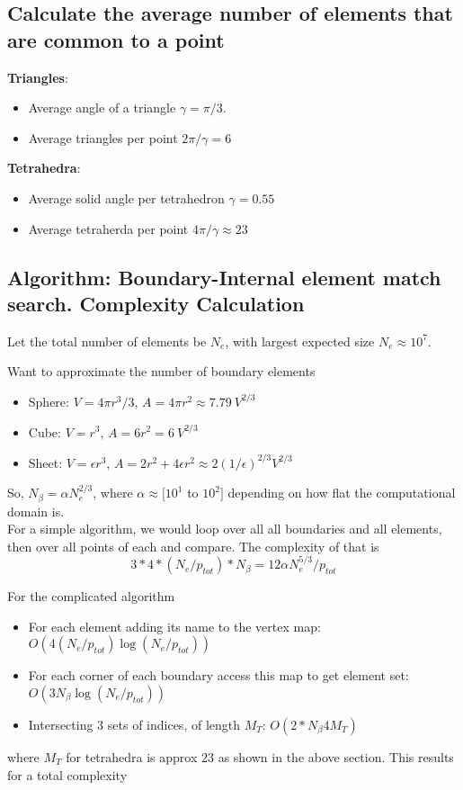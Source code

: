 \documentclass[12pt]{article}
\begin{document}
\newpage
\appendix

\subsection{Calculate the average number of elements that are common to a point}

\textbf{Triangles}:
\begin{itemize}
	\item Average angle of a triangle $\gamma = \pi/3$.
	\item Average triangles per point $2\pi / \gamma = 6$
\end{itemize}
\noindent
\textbf{Tetrahedra}:
\begin{itemize}
	\item Average solid angle per tetrahedron $\gamma = 0.55$
	\item Average tetraherda per point $4\pi / \gamma \approx 23$
\end{itemize}

\subsection{Algorithm: Boundary-Internal element match search. Complexity Calculation}

\noindent
Let the total number of elements be $N_e$, with largest expected size $N_e \approx 10^7$.

\noindent
Want to approximate the number of boundary elements
\begin{itemize}
	\item Sphere: $V = 4\pi r^3 / 3$, $A = 4\pi r^2 \approx 7.79\ V^{2/3}$
	\item Cube: $V = r^3$, $A = 6 r^2 = 6\ V^{2/3}$
	\item Sheet: $V = \epsilon r^3$, $A = 2 r^2 + 4\epsilon r^2 \approx 2(1/\epsilon)^{2/3} V^{2/3}$
\end{itemize}
\noindent
So, $N_{\beta} = \alpha N_e^{2/3}$, where $\alpha \approx [10^1$ to $10^2]$ depending on how flat the computational domain is. \\

\noindent
For a simple algorithm, we would loop over all all boundaries and all elements, then over all points of each and compare.
The complexity of that is \[ 3*4 * (N_e / p_{tot}) * N_{\beta} = 12 \alpha N_e^{5/3} / p_{tot} \]

\noindent
For the complicated algorithm
\begin{itemize}
	\item For each element adding its name to the vertex map: $O(4 (N_e / p_{tot}) \log(N_e / p_{tot}) )$
	\item For each corner of each boundary access this map to get element set: $O(3 N_{\beta} \log(N_e / p_{tot}))$
	\item Intersecting 3 sets of indices, of length $M_T$: $O(2 * N_{\beta} 4M_T)$
\end{itemize}
\noindent
where $M_T$ for tetrahedra is approx $23$ as shown in the above section. This results for a total complexity
\end{document}
